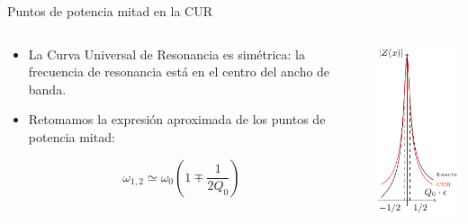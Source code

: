\documentclass[xcolor={usenames,svgnames,dvipsnames}]{beamer}
\begin{document}
\begin{frame}[label={sec:orgb149261}]{Puntos de potencia mitad en la CUR}
\begin{columns}
\begin{column}{0.7\columnwidth}
\begin{itemize}
\item La Curva Universal de Resonancia es simétrica: la frecuencia de resonancia está en el centro del ancho de banda.
\item Retomamos la expresión aproximada de los puntos de potencia mitad:
\end{itemize}
\[
  \omega_{1,2} \simeq \omega_0 (1 \mp \frac{1}{2Q_0})
\]
\end{column}

\begin{column}{0.3\columnwidth}
\begin{center}
\includegraphics[width=.9\linewidth]{figs/CUR.pdf}
\end{center}
\end{column}
\end{columns}


\end{frame}
\end{document}
